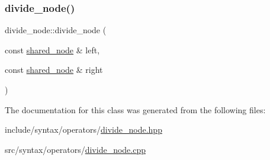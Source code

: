 \subsubsection{\texorpdfstring{divide\+\_\+node()}{divide\_node()}}
{\footnotesize\ttfamily divide\+\_\+node\+::divide\+\_\+node (\begin{DoxyParamCaption}\item[{const \hyperlink{namespacejawe_a3f307481d921b6cbb50cc8511fc2b544}{shared\+\_\+node} \&}]{left,  }\item[{const \hyperlink{namespacejawe_a3f307481d921b6cbb50cc8511fc2b544}{shared\+\_\+node} \&}]{right }\end{DoxyParamCaption})}



The documentation for this class was generated from the following files\+:\begin{DoxyCompactItemize}
\item 
include/syntax/operators/\hyperlink{divide__node_8hpp}{divide\+\_\+node.\+hpp}\item 
src/syntax/operators/\hyperlink{divide__node_8cpp}{divide\+\_\+node.\+cpp}\end{DoxyCompactItemize}

